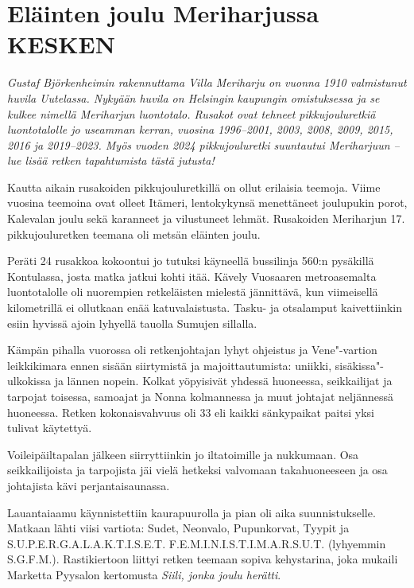 \section{Eläinten joulu Meriharjussa KESKEN}

\textit{Gustaf Björkenheimin rakennuttama Villa Meriharju on vuonna 1910 
valmistunut huvila Uutelassa. Nykyään huvila on Helsingin kaupungin 
omistuksessa ja se kulkee nimellä Meriharjun luontotalo. Rusakot ovat tehneet 
pikkujouluretkiä luontotalolle jo useamman kerran, vuosina 1996--2001, 2003, 
2008, 2009, 2015, 2016 ja 2019--2023. Myös vuoden 2024 pikkujouluretki 
suuntautui Meriharjuun -- lue lisää retken tapahtumista tästä jutusta!}

\begin{multicols}{2}
\noindent Kautta aikain rusakoiden pikkujouluretkillä on ollut erilaisia 
teemoja. Viime vuosina teemoina ovat olleet Itämeri, lentokykynsä 
menettäneet joulupukin porot, Kalevalan joulu sekä karanneet ja vilustuneet 
lehmät. Rusakoiden Meriharjun 17. pikkujouluretken teemana oli metsän 
eläinten joulu. 

Peräti 24 rusakkoa kokoontui jo tutuksi käyneellä bussilinja 560:n 
pysäkillä Kontulassa, josta matka jatkui kohti itää. Kävely Vuosaaren 
metroasemalta luontotalolle oli nuorempien retkeläisten mielestä 
jännittävä, kun viimeisellä kilometrillä ei ollutkaan enää 
katuvalaistusta. Tasku- ja otsalamput kaivettiinkin esiin hyvissä ajoin 
lyhyellä tauolla Sumujen sillalla. 

Kämpän pihalla vuorossa oli retkenjohtajan lyhyt ohjeistus ja Vene"-vartion 
leikkikimara ennen sisään siirtymistä ja majoittautumista: uniikki, 
sisäkissa"-ulkokissa ja lännen nopein. Kolkat yöpyisivät yhdessä 
huoneessa, seikkailijat ja tarpojat toisessa, samoajat ja Nonna kolmannessa ja 
muut johtajat neljännessä huoneessa. Retken kokonaisvahvuus oli 33 eli kaikki 
sänkypaikat paitsi yksi tulivat käytettyä.

Voileipäiltapalan jälkeen siirryttiinkin jo iltatoimille ja nukkumaan. Osa 
seikkailijoista ja tarpojista jäi vielä hetkeksi valvomaan takahuoneeseen ja 
osa johtajista kävi perjantaisaunassa.

Lauantaiaamu käynnistettiin kaurapuurolla ja pian oli aika suunnistukselle. 
Matkaan lähti viisi vartiota: Sudet, Neonvalo, Pupunkorvat, Tyypit ja 
S.U.P.E.R.G.A.L.A.K.T.I.S.E.T. F.E.M.I.N.I.S.T.I.M.A.R.S.U.T. (lyhyemmin 
S.G.F.M.). Rastikiertoon liittyi retken teemaan sopiva kehystarina, joka 
mukaili Marketta Pyysalon kertomusta \textit{Siili, jonka joulu herätti}. 


\end{multicols}
